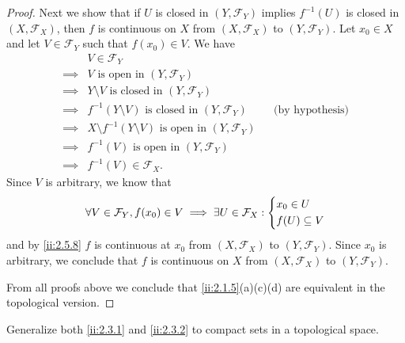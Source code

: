 \begin{proof}
  Next we show that if \(U\) is closed in \((Y, \mathcal{F}_Y)\) implies \(f^{-1}(U)\) is closed in \((X, \mathcal{F}_X)\), then \(f\) is continuous on \(X\) from \((X, \mathcal{F}_X)\) to \((Y, \mathcal{F}_Y)\).
  Let \(x_0 \in X\) and let \(V \in \mathcal{F}_Y\) such that \(f(x_0) \in V\).
  We have
  \begin{align*}
             & V \in \mathcal{F}_Y                                                                                  \\
    \implies & V \text{ is open in } (Y, \mathcal{F}_Y)                                                             \\
    \implies & Y \setminus V \text{ is closed in } (Y, \mathcal{F}_Y)                                               \\
    \implies & f^{-1}(Y \setminus V) \text{ is closed in } (Y, \mathcal{F}_Y)           &  & \text{(by hypothesis)} \\
    \implies & X \setminus f^{-1}(Y \setminus V) \text{ is open in } (Y, \mathcal{F}_Y)                             \\
    \implies & f^{-1}(V) \text{ is open in } (Y, \mathcal{F}_Y)                                                     \\
    \implies & f^{-1}(V) \in \mathcal{F}_X.
  \end{align*}
  Since \(V\) is arbitrary, we know that
  \[
    \forall V \in \mathcal{F}_Y, f(x_0) \in V \implies \exists U \in \mathcal{F}_X : \begin{dcases}
      x_0 \in U \\
      f(U) \subseteq V
    \end{dcases}
  \]
  and by \cref{ii:2.5.8} \(f\) is continuous at \(x_0\) from \((X, \mathcal{F}_X)\) to \((Y, \mathcal{F}_Y)\).
  Since \(x_0\) is arbitrary, we conclude that \(f\) is continuous on \(X\) from \((X, \mathcal{F}_X)\) to \((Y, \mathcal{F}_Y)\).

  From all proofs above we conclude that \cref{ii:2.1.5}(a)(c)(d) are equivalent in the topological version.
\end{proof}

\begin{ex}\label{ii:ex:2.5.17}
  Generalize both \cref{ii:2.3.1} and \cref{ii:2.3.2} to compact sets in a topological space.
\end{ex}

